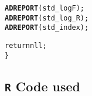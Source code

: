 \documentclass[11pt]{article}\usepackage[]{graphicx}\usepackage[]{color}
\makeatletter
\newcommand{\hlkwd}[1]{\textcolor[rgb]{0.737,0.353,0.396}{\textbf{#1}}}%
\newenvironment{kframe}{%
 \def\at@end@of@kframe{}%
 \ifinner\ifhmode%
  \def\at@end@of@kframe{\end{minipage}}%
  \begin{minipage}{\columnwidth}%
 \fi\fi%
 \def\FrameCommand##1{\hskip\@totalleftmargin \hskip-\fboxsep
 \colorbox{shadecolor}{##1}\hskip-\fboxsep
     \hskip-\linewidth \hskip-\@totalleftmargin \hskip\columnwidth}%
 \MakeFramed {\advance\hsize-\width
   \@totalleftmargin\z@ \linewidth\hsize
   \@setminipage}}%
 {\par\unskip\endMakeFramed%
 \at@end@of@kframe}
\newenvironment{knitrout}{}{} %
\makeatother
\begin{document}
\begin{appendices}
\begin{knitrout}
\begin{kframe}
\begin{alltt}
\hlkwd{ADREPORT}(std_logF);      
\hlkwd{ADREPORT}(std_log_R);
\hlkwd{ADREPORT}(std_index);  

return nll;
\}
\end{alltt}
\end{kframe}
\end{knitrout}

\subsection{\texttt{R} Code used}\label{Rcode}
	
\end{appendices}
\end{document}
